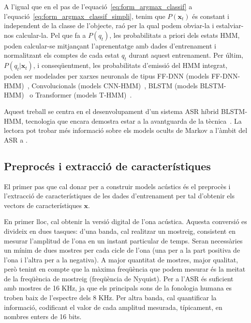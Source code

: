 A l'igual que en el pas de l'equació~\ref{eq:form_argmax_classif} a l'equació~\ref{eq:form_argmax_classif_simpli}, tenim que $P(\textbf{x}_t)$ és constant i independent de la classe de l'objecte, raó per la qual podem obviar-la i estalviar-nos calcular-la. Pel que fa a $P(q_t)$, les probabilitats a priori dels estats HMM, poden calcular-se mitjançant l'aprenentatge amb dades d'entrenament i normalitzant els comptes de cada estat $q_t$ durant aquest entrenament.
Per últim, $P(q_t|\textbf{x}_t)$, i conseqüentment, les probabilitats d'emissió del HMM integrat, poden ser modelades per xarxes neuronals de tipus FF-DNN (models FF-DNN-HMM)~\cite{hinton2012}, Convolucionals (models CNN-HMM)~\cite{6857341}, BLSTM (models BLSTM-HMM)~\cite{mllp2020} o Transformer (models T-HMM)~\cite{wang2020transformers_asr}.

Aquest treball se centra en el desenvolupament d'un sistema ASR híbrid BLSTM-HMM, tecnologia que encara demostra estar a la avantguarda de la tècnica~\cite{jorge2021iberspeech}.
La lectora pot trobar més informació sobre els models ocults de Markov a l'àmbit del ASR a \cite[capítol 8.4]{jurafskySLP}.



\subsection{Preprocés i extracció de característiques}
\label{cap02_preprocessat_acustic}
El primer pas que cal donar per a construir models acústics és el preprocès i l'extracció de característiques de les dades d'entrenament per tal d'obtenir els vectors de característiques $\textbf{x}$. 

En primer lloc, cal obtenir la versió digital de l'ona acústica. Aquesta conversió es divideix en dues tasques: d'una banda, cal realitzar un mostreig, consistent en mesurar l'amplitud de l'ona en un instant particular de temps.
Seran necessàries un mínim de dues mostres per cada cicle de l'ona (una per a la part positiva de l'ona i l'altra per a la negativa). A major quantitat de mostres, major qualitat, però tenint en compte que la màxima freqüència que podem mesurar és la meitat de la freqüència de mostreig (freqüència de Nyquist\cite{grenander1959probability}).
Per a l'ASR és suficient amb mostres de 16 KHz, ja que els principals sons de la fonologia humana es troben baix de l'espectre dels 8 KHz.
Per altra banda, cal quantificar la informació, codificant el valor de cada amplitud mesurada, típicament, en nombres enters de 16 bits.

